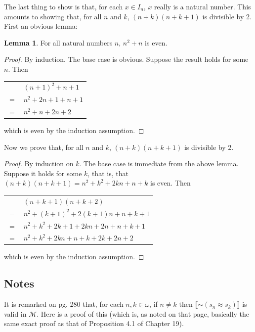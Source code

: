 \documentclass{article}
\newcommand*{\oldneg}{\mathord{\sim}}
\newcommand{\lbc}{\llbracket}
\newcommand{\rbc}{\rrbracket}
\theoremstyle{definition}
\newtheorem{lemma}[theorem]{Lemma}
\begin{document}
The last thing to show is that, for each $x\in I_n$, $x$ really is a natural number. This amounts to showing that, 
for all $n$ and $k$, $(n+k)(n+k+1)$ is divisible by 2. First an obvious lemma:

\begin{lemma}
For all natural numbers $n$, $n^2+n$ is even.
\end{lemma}

\begin{proof}
By induction. The base case is obvious. Suppose the result holds for some $n$. Then 
\begin{center}
\begin{tabular}{ll}
    & $(n+1)^2+n+1$ \\
$=$ & $n^2+2n+1+n+1$ \\
$=$ & $n^2+n+2n+2$
\end{tabular}
\end{center}
which is even by the induction assumption.

\end{proof}

Now we prove that, for all $n$ and $k$, $(n+k)(n+k+1)$ is divisible by 2.

\begin{proof}
By induction on $k$. The base case is immediate from the above lemma.
Suppose it holds for some $k$, that is, that $(n+k)(n+k+1)=n^2+k^2+2kn+n+k$ is even. Then
\begin{center}
\begin{tabular}{ll}
    & $(n+k+1)(n+k+2)$ \\
$=$ & $n^2+(k+1)^2+2(k+1)n+n+k+1$ \\
$=$ & $n^2+k^2+2k+1+2kn+2n+n+k+1$ \\
$=$ & $n^2+k^2+2kn+n+k+2k+2n+2$
\end{tabular}
\end{center}
which is even by the induction assumption.

\end{proof}

\subsection*{Notes}
It is remarked on pg. 280 that, for each $n,k\in\omega$, if $n\ne k$ then $\lbc\oldneg(s_n\approx s_k)\rbc$ is valid in $\mathcal{M}$. Here 
is a proof of this (which is, as noted on that page, basically the same exact proof as that of Proposition 4.1 of Chapter 19).
\end{document}

